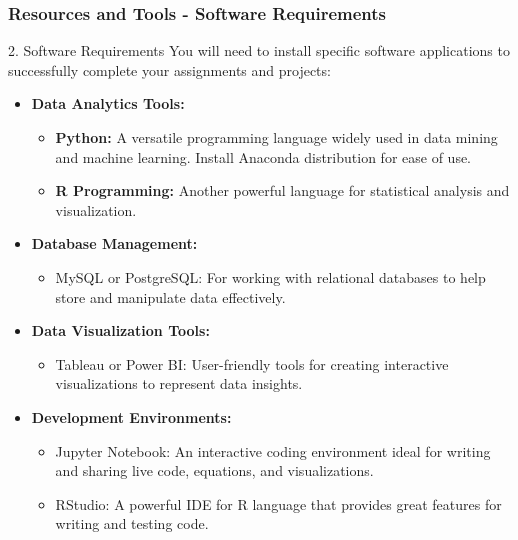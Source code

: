 \documentclass[aspectratio=169]{beamer}
\begin{document}
\begin{frame}[fragile]
    \frametitle{Resources and Tools - Software Requirements}
    \begin{block}{2. Software Requirements}
        You will need to install specific software applications to successfully complete your assignments and projects:
    \end{block}
    \begin{itemize}
        \item \textbf{Data Analytics Tools:}
        \begin{itemize}
            \item \textbf{Python:} A versatile programming language widely used in data mining and machine learning. Install Anaconda distribution for ease of use.
            \item \textbf{R Programming:} Another powerful language for statistical analysis and visualization.
        \end{itemize}
        \item \textbf{Database Management:}
        \begin{itemize}
            \item MySQL or PostgreSQL: For working with relational databases to help store and manipulate data effectively.
        \end{itemize}
        \item \textbf{Data Visualization Tools:}
        \begin{itemize}
            \item Tableau or Power BI: User-friendly tools for creating interactive visualizations to represent data insights.
        \end{itemize}
        \item \textbf{Development Environments:}
        \begin{itemize}
            \item Jupyter Notebook: An interactive coding environment ideal for writing and sharing live code, equations, and visualizations.
            \item RStudio: A powerful IDE for R language that provides great features for writing and testing code.
        \end{itemize}
    \end{itemize}
\end{frame}
\end{document}
